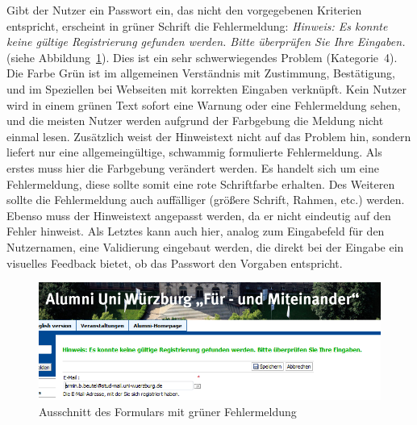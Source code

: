 {
Gibt der Nutzer ein Passwort ein, das nicht den vorgegebenen Kriterien entspricht, erscheint in grüner Schrift die Fehlermeldung: \emph{Hinweis: Es konnte keine gültige Registrierung gefunden werden. Bitte überprüfen Sie Ihre Eingaben.} (siehe Abbildung~\ref{fig:greenerror}).
}
{
Dies ist ein sehr schwerwiegendes Problem (Kategorie~4). Die Farbe Grün ist im allgemeinen Verständnis mit Zustimmung, Bestätigung, und im Speziellen bei Webseiten mit korrekten Eingaben verknüpft. Kein Nutzer wird in einem grünen Text sofort eine Warnung oder eine Fehlermeldung sehen, und die meisten Nutzer werden aufgrund der Farbgebung die Meldung nicht einmal lesen. Zusätzlich weist der Hinweistext nicht auf das Problem hin, sondern liefert nur eine allgemeingültige, schwammig formulierte Fehlermeldung.
}
{
Als erstes muss hier die Farbgebung verändert werden. Es handelt sich um eine Fehlermeldung, diese sollte somit eine rote Schriftfarbe erhalten. Des Weiteren sollte die Fehlermeldung auch auffälliger (größere Schrift, Rahmen, etc.) werden. Ebenso muss der Hinweistext angepasst werden, da er nicht eindeutig auf den Fehler hinweist. Als Letztes kann auch hier, analog zum Eingabefeld für den Nutzernamen, eine Validierung eingebaut werden, die direkt bei der Eingabe ein visuelles Feedback bietet, ob das Passwort den Vorgaben entspricht.
}
\label{prob:frei:warntextgruen}

\begin{figure}
	\centering
		\includegraphics[width=\textwidth]{figures/greenerror.png}
	\caption{Ausschnitt des Formulars mit grüner Fehlermeldung}
	\label{fig:greenerror}
\end{figure}

